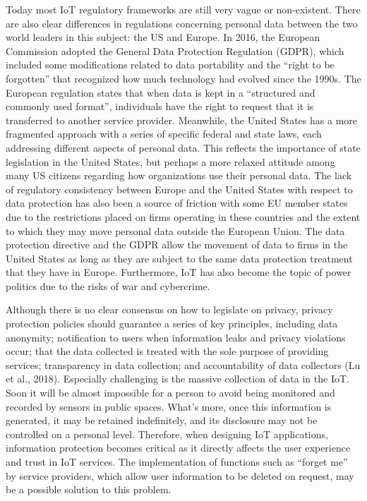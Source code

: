\documentclass[
  letterpaper,
  DIV=11,
  numbers=noendperiod]{scrreprt}
\begin{document}
Today most IoT regulatory frameworks are still very vague or
non-existent. There are also clear differences in regulations concerning
personal data between the two world leaders in this subject: the US and
Europe. In 2016, the European Commission adopted the General Data
Protection Regulation (GDPR), which included some modifications related
to data portability and the ``right to be forgotten'' that recognized
how much technology had evolved since the 1990s. The European regulation
states that when data is kept in a ``structured and commonly used
format'', individuals have the right to request that it is transferred
to another service provider. Meanwhile, the United States has a more
fragmented approach with a series of specific federal and state laws,
each addressing different aspects of personal data. This reflects the
importance of state legislation in the United States, but perhaps a more
relaxed attitude among many US citizens regarding how organizations use
their personal data. The lack of regulatory consistency between Europe
and the United States with respect to data protection has also been a
source of friction with some EU member states due to the restrictions
placed on firms operating in these countries and the extent to which
they may move personal data outside the European Union. The data
protection directive and the GDPR allow the movement of data to firms in
the United States as long as they are subject to the same data
protection treatment that they have in Europe. Furthermore, IoT has also
become the topic of power politics due to the risks of war and
cybercrime.

Although there is no clear consensus on how to legislate on privacy,
privacy protection policies should guarantee a series of key principles,
including data anonymity; notification to users when information leaks
and privacy violations occur; that the data collected is treated with
the sole purpose of providing services; transparency in data collection;
and accountability of data collectors (Lu et al., 2018). Especially
challenging is the massive collection of data in the IoT. Soon it will
be almost impossible for a person to avoid being monitored and recorded
by sensors in public spaces. What's more, once this information is
generated, it may be retained indefinitely, and its disclosure may not
be controlled on a personal level. Therefore, when designing IoT
applications, information protection becomes critical as it directly
affects the user experience and trust in IoT services. The
implementation of functions such as ``forget me'' by service providers,
which allow user information to be deleted on request, may be a possible
solution to this problem.
\end{document}

